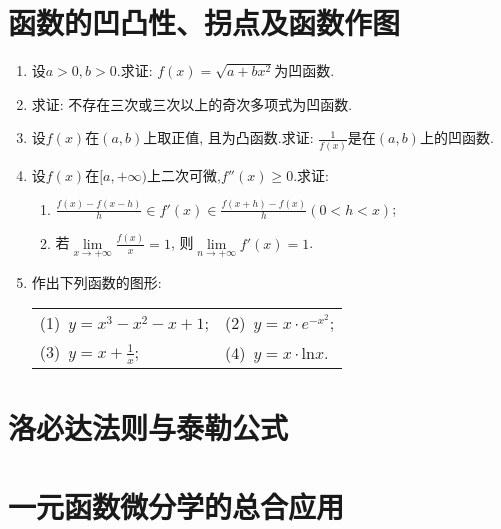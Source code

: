 \section{函数的凹凸性、拐点及函数作图}
\begin{enumerate}
	\item 设$a>0,b>0$.求证: $f(x)=\sqrt{a+bx^2}$为凹函数.
	\item 求证: 不存在三次或三次以上的奇次多项式为凹函数.
	\item 设$f(x)$在$(a,b)$上取正值, 且为凸函数.求证: $\frac{1}{f(x)}$是在$(a,b)$上的凹函数.
	\item 设$f(x)$在$[a,+\infty)$上二次可微,$f''(x)\ge 0$.求证:
	\begin{enumerate}
	\item $\frac{f(x)-f(x-h)}{h}\in f'(x)\in \frac{f(x+h)-f(x)}{h}(0<h<x)$;
	\item 若$\lim\limits_{x\rightarrow +\infty}\frac{f(x)}{x}=1$, 则$\lim\limits_{n\rightarrow +\infty}f'(x)=1$.
	\end{enumerate}
	\item 作出下列函数的图形:
	\begin{table}[H]
		\begin{tabular}{ll}
			\qquad	(1)\ $y=x^3-x^2-x+1$;\qquad \qquad& (2)\ $y=x\cdot e^{-x^2}$;\\
			\qquad (3)\ $y=x+\frac{1}{x}$; \qquad \qquad &(4)\ $y=x\cdot \mathrm{ln}x$.
		\end{tabular}
	\end{table}

\end{enumerate}

\section{洛必达法则与泰勒公式}

\section{一元函数微分学的总合应用}